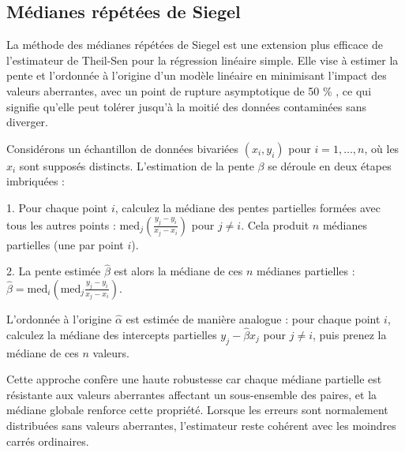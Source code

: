 \subsection{Médianes répétées de Siegel}
 La méthode des médianes répétées de Siegel \citep{siegel1982robust} est une extension plus efficace de l'estimateur de Theil-Sen pour la régression linéaire simple. Elle vise à estimer la pente et l'ordonnée à l'origine d'un modèle linéaire en minimisant l'impact des valeurs aberrantes, avec un point de rupture asymptotique de 50 \% \citep{rousseeuw2003robust}, ce qui signifie qu'elle peut tolérer jusqu'à la moitié des données contaminées sans diverger.
 
 Considérons un échantillon de données bivariées \((x_i, y_i)\) pour \(i = 1, \dots, n\), où les \(x_i\) sont supposés distincts. L'estimation de la pente \(\beta\) se déroule en deux étapes imbriquées :
 
 1. Pour chaque point \(i\), calculez la médiane des pentes partielles formées avec tous les autres points : \(\text{med}_j \left( \frac{y_j - y_i}{x_j - x_i} \right)\) pour \(j \neq i\). Cela produit \(n\) médianes partielles (une par point \(i\)).
 
 2. La pente estimée \(\hat{\beta}\) est alors la médiane de ces \(n\) médianes partielles : \(\hat{\beta} = \text{med}_i \left( \text{med}_j \frac{y_j - y_i}{x_j - x_i} \right)\).
 
 L'ordonnée à l'origine \(\hat{\alpha}\) est estimée de manière analogue : pour chaque point \(i\), calculez la médiane des intercepts partielles \(y_j - \hat{\beta} x_j\) pour \(j \neq i\), puis prenez la médiane de ces \(n\) valeurs.
 
 Cette approche confère une haute robustesse car chaque médiane partielle est résistante aux valeurs aberrantes affectant un sous-ensemble des paires, et la médiane globale renforce cette propriété. Lorsque les erreurs sont normalement distribuées sans valeurs aberrantes, l'estimateur reste cohérent avec les moindres carrés ordinaires.
 